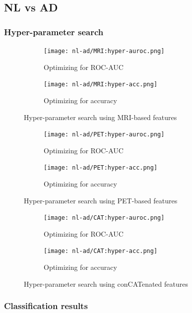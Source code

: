 \documentclass[12pt,a4paper]{article}
\begin{document}
\subsection{NL vs AD}
\label{sec:nl-ad}

\subsubsection{Hyper-parameter search}
\label{sec:nl-ad-hyper}

\begin{figure}[H]
  \centering
  \begin{subfigure}[h]{0.49\textwidth}
    \texttt{[image: nl-ad/MRI:hyper-auroc.png]}
    \caption{Optimizing for ROC-AUC}  
  \end{subfigure}
  \begin{subfigure}[h]{0.49\textwidth}
    \texttt{[image: nl-ad/MRI:hyper-acc.png]}
    \caption{Optimizing for accuracy}  
  \end{subfigure}
  \caption{Hyper-parameter search using MRI-based features}
\end{figure}

\begin{figure}[H]
  \centering
  \begin{subfigure}[h]{0.49\textwidth}
    \texttt{[image: nl-ad/PET:hyper-auroc.png]}
    \caption{Optimizing for ROC-AUC}  
  \end{subfigure}
  \begin{subfigure}[h]{0.49\textwidth}
    \texttt{[image: nl-ad/PET:hyper-acc.png]}
    \caption{Optimizing for accuracy}  
  \end{subfigure}
  \caption{Hyper-parameter search using PET-based features}
\end{figure}

\begin{figure}[H]
  \centering
  \begin{subfigure}[h]{0.49\textwidth}
    \texttt{[image: nl-ad/CAT:hyper-auroc.png]}
    \caption{Optimizing for ROC-AUC}  
  \end{subfigure}
  \begin{subfigure}[h]{0.49\textwidth}
    \texttt{[image: nl-ad/CAT:hyper-acc.png]}
    \caption{Optimizing for accuracy}  
  \end{subfigure}
  \caption{Hyper-parameter search using conCATenated features}
\end{figure}

\subsubsection{Classification results}
\label{sec:nl-ad-res}
\end{document}
